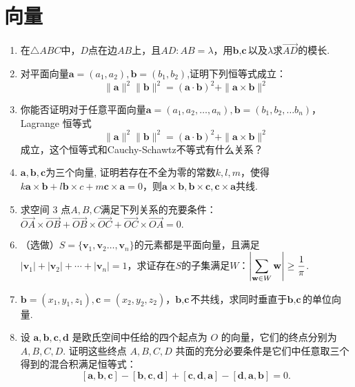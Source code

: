 \section{向量}

\begin{enumerate}
    \item 在\(\triangle ABC\)中，\(D\)点在边\(AB\)上，且\(AD:AB=\lambda\)，用\(\textbf{b},\textbf{c}\)以及\(\lambda\)求\(\overrightarrow{AD}\)的模长.
    \item  对平面向量$\textbf{a}=(a_1,a_2),\textbf{b}=(b_1,b_2)$,证明下列恒等式成立：$$\|\textbf{a}\|^2\|\textbf{b}\|^2=(\textbf{a}\cdot\textbf{b})^2+\|\textbf{a}\times\textbf{b}\|^2$$
    \item  你能否证明对于任意平面向量\(\textbf{a}=(a_1,a_2,\dots,a_n),\textbf{b}=(b_1,b_2,\dots b_n)\)，Lagrange 恒等式$$\|\textbf{a}\|^2\|\textbf{b}\|^2=(\textbf{a}\cdot\textbf{b})^2+\|\textbf{a}\times\textbf{b}\|^2$$成立，这个恒等式和Cauchy-Schawtz不等式有什么关系？
    \item \(\textbf{a},\textbf{b},\textbf{c}\)为三个向量, 证明若存在不全为零的常数\(k,l,m\)，使得\(k\textbf{a}\times \textbf{b}+l\textbf{b}\times c+m\textbf{c}\times \textbf{a}=0\)，则\(\textbf{a}\times \textbf{b},\textbf{b}\times \textbf{c},\textbf{c}\times \textbf{a}\)共线.
    \item 求空间 $3$ 点$A,B,C$满足下列关系的充要条件：$\overrightarrow{OA}\times\overrightarrow{OB}+\overrightarrow{OB}\times\overrightarrow{OC}+\overrightarrow{OC}\times\overrightarrow{OA}=0.$
    
    \item （选做）\(S=\{\textbf{v}_1,\textbf{v}_2\dots,\textbf{v}_n\}\)的元素都是平面向量，且满足\(|\textbf{v}_1|+|\textbf{v}_2|+\cdots+|\textbf{v}_n|=1\)，求证存在\(S\)的子集满足\(W\)：\(\displaystyle 
    \left|\sum_{\textbf{w}\in W}\textbf w\right|\geq \frac1\pi\).
    \begin{center}
    \end{center}
        
    \item \(\textbf{b}=(x_1,y_1,z_1),\textbf{c}=(x_2,y_2,z_2)\)，\(\textbf{b},\textbf{c}\)不共线，求同时垂直于\(\textbf{b},\textbf{c}\)的单位向量.
    \item 设 $\mathbf{a}, \mathbf{b}, \mathbf{c}, \mathbf{d}$ 是欧氏空间中任给的四个起点为 $O$ 的向量，它们的终点分别为 $A, B, C, D$. 证明这些终点 $A, B, C, D$ 共面的充分必要条件是它们中任意取三个得到的混合积满足恒等式：
$$ [\mathbf{a}, \mathbf{b}, \mathbf{c}] - [\mathbf{b}, \mathbf{c}, \mathbf{d}] + [\mathbf{c}, \mathbf{d}, \mathbf{a}] - [\mathbf{d}, \mathbf{a}, \mathbf{b}] = 0. $$
\end{enumerate}
    

